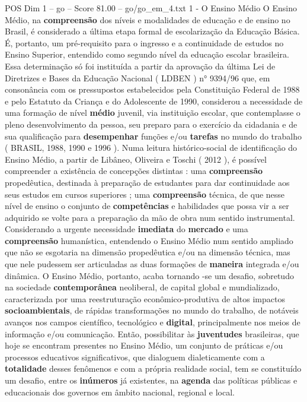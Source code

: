 \begin{textsample}{POS Dim 1 – go – Score 81.00 – go/go\_em\_4.txt}  \label{ex:f1_pos_091}
1 - O Ensino Médio O Ensino Médio, na \textbf{compreensão} dos níveis e modalidades de educação e de ensino no Brasil, é considerado a última etapa formal de escolarização da Educação Básica.
É, portanto, um pré-requisito para o ingresso e a continuidade de estudos no Ensino Superior, entendido como segundo nível da educação escolar brasileira.
Essa determinação só foi instituída a partir da aprovação da última Lei de Diretrizes e Bases da Educação Nacional ( LDBEN ) n{\EmojiFont °} 9394/96 que, em consonância com os pressupostos estabelecidos pela Constituição Federal de 1988 e pelo Estatuto da Criança e do Adolescente de 1990, considerou a necessidade de uma formação de nível \textbf{médio} juvenil, via instituição escolar, que contemplasse o pleno desenvolvimento da pessoa, seu preparo para o exercício da cidadania e de sua qualificação para \textbf{desempenhar} funções e/ou \textbf{tarefas} no mundo do trabalho ( BRASIL, 1988, 1990 e 1996 ).
Numa leitura histórico-social de identificação do Ensino Médio, a partir de Libâneo, Oliveira e Toschi ( 2012 ), é possível compreender a existência de concepções distintas : uma \textbf{compreensão} propedêutica, destinada à preparação de estudantes para dar continuidade aos seus estudos em cursos superiores ; uma \textbf{compreensão} técnica, de que nesse nível de ensino o conjunto de \textbf{competências} e habilidades que possa vir a ser adquirido se volte para a preparação da mão de obra num sentido instrumental.
Considerando a urgente necessidade \textbf{imediata} do \textbf{mercado} e uma \textbf{compreensão} humanística, entendendo o Ensino Médio num sentido ampliado que não se esgotaria na dimensão propedêutica e/ou na dimensão técnica, mas que nele pudessem ser articuladas as duas formações de \textbf{maneira} integrada e/ou dinâmica.
O Ensino Médio, portanto, acaba tornando -se um desafio, sobretudo na sociedade \textbf{contemporânea} neoliberal, de capital global e mundializado, caracterizada por uma reestruturação econômico-produtiva de altos impactos \textbf{socioambientais}, de rápidas transformações no mundo do trabalho, de notáveis avanços nos campos científico, tecnológico e \textbf{digital}, principalmente nos meios de informação e/ou comunicação.
Então, possibilitar às \textbf{juventudes} brasileiras, que hoje se encontram presentes no Ensino Médio, um conjunto de práticas e/ou processos educativos significativos, que dialoguem dialeticamente com a \textbf{totalidade} desses fenômenos e com a própria realidade social, tem se constituído um desafio, entre os \textbf{inúmeros} já existentes, na \textbf{agenda} das políticas públicas e educacionais dos governos em âmbito nacional, regional e local.

\end{textsample}
